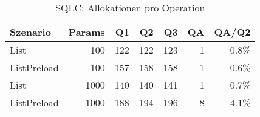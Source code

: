 \begin{table}[ht]
\centering
\caption{SQLC: Allokationen pro Operation}
\begin{tabular}{lrrrrrr}
\toprule
Szenario & Params & Q1 & Q2 & Q3 & QA & QA/Q2 \\
\midrule
		List & 100 & 122 & 122 & 123 & 1 & 0.8\% \\
		ListPreload & 100 & 157 & 158 & 158 & 1 & 0.6\% \\
		List & 1000 & 140 & 140 & 141 & 1 & 0.7\% \\
		ListPreload & 1000 & 188 & 194 & 196 & 8 & 4.1\% \\
\bottomrule
\end{tabular}
\label{tab:benchmark_sqlc_allocsperop}
\end{table}
	